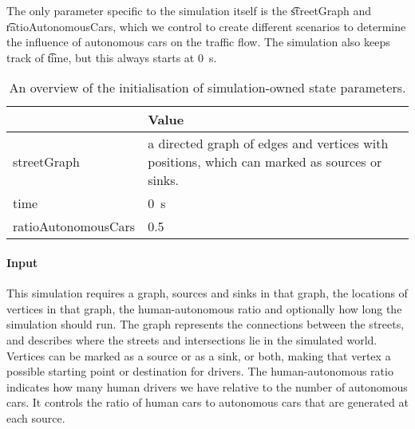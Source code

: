 The only parameter specific to the simulation itself is the \t{streetGraph} and \t{ratioAutonomousCars}, which we control to create different scenarios to determine the influence of autonomous cars on the traffic flow. The simulation also keeps track of \t{time}, but this always starts at \si{0\second}.

\begin{table}
	\centering
	\begin{tabularx}{\textwidth}{>{\ttfamily}lX}
		\toprule
		\normalfont{Parameter}	& Value \\  
		\midrule
		streetGraph
			& a directed graph of edges and vertices with positions, which can marked as sources or sinks. \\
		time 
			& \si{0\second} \\
		ratioAutonomousCars
			& 0.5 \\
		\bottomrule
	\end{tabularx}
	\caption{An overview of the initialisation of simulation-owned state parameters.}
	\label{tab:par:method:model:details:init:simulation:value}
\end{table}

\paragraph{Input}
\label{par:method:model:details:input}
This simulation requires a graph, sources and sinks in that graph, the locations of vertices in that graph, the human-autonomous ratio and optionally how long the simulation should run. The graph represents the connections between the streets, and describes where the streets and intersections lie in the simulated world. Vertices can be marked as a source or as a sink, or both, making that vertex a possible starting point or destination for drivers. The human-autonomous ratio indicates how many human drivers we have relative to the number of autonomous cars. It controls the ratio of human cars to autonomous cars that are generated at each source.